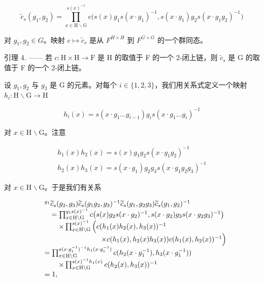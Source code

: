 \[
\widetilde {c} _ {s} (g _ {1}, g _ {2}) = \prod_ {x \in \mathrm{H} \backslash \mathrm{G}} ^ {s (x) ^ {- 1}} c \bigl (s (x) g _ {1} s (x \cdot g _ {1}) ^ {- 1}, s (x \cdot g _ {1}) g _ {2} s (x \cdot g _ {1} g _ {2}) ^ {- 1} \bigr)
\]

对 \(g_{1}, g_{2} \in G\)。映射 \(c \mapsto \widetilde{c}_{s}\) 是从 \(F^{H \times H}\) 到 \(F^{G \times G}\) 的一个群同态。

引理 4. —— 若 \(c: \mathrm{H} \times \mathrm{H} \to \mathrm{F}\) 是 H 的取值于 F 的一个 2-闭上链，则 \(\widetilde{c}_s\) 是 G 的取值于 F 的一个 2-闭上链。

设 \(g_1, g_2\) 与 \(g_3\) 是 G 的元素。对每个 \(i \in \{1, 2, 3\}\)，我们用关系式定义一个映射 \(h_i: \mathrm{H} \backslash \mathrm{G} \to \mathrm{H}\)

\[
h _ {i} (x) = s \left(x \cdot g _ {1} \dots g _ {i - 1}\right) g _ {i} s \left(x \cdot g _ {1} \dots g _ {i}\right) ^ {- 1}
\]

对 \(x\in \mathrm{H}\backslash \mathrm{G}\)。注意

\[
\begin{array}{l} {h _ {1} (x) h _ {2} (x) = s (x) g _ {1} g _ {2} s (x \cdot g _ {1} g _ {2}) ^ {- 1}} \\ {h _ {2} (x) h _ {3} (x) = s (x \cdot g _ {1}) g _ {2} g _ {3} s (x \cdot g _ {1} g _ {2} g _ {3}) ^ {- 1}} \end{array}
\]

对 \(x \in \mathrm{H} \backslash \mathrm{G}\)。于是我们有关系

\[
\begin{array}{r l} & ^ {g _ {1}} \widetilde {c} _ {s} (g _ {2}, g _ {3}) \widetilde {c} _ {s} (g _ {1} g _ {2}, g _ {3}) ^ {- 1} \widetilde {c} _ {s} (g _ {1}, g _ {2} g _ {3}) \widetilde {c} _ {s} (g _ {1}, g _ {2}) ^ {- 1} \\ & \quad = \prod_ {x \in \mathrm{H} \backslash \mathrm{G}} ^ {g _ {1} s (x) ^ {- 1}} c \big (s (x) g _ {2} s (x \cdot g _ {2}) ^ {- 1}, s (x \cdot g _ {2}) g _ {3} s (x \cdot g _ {2} g _ {3}) ^ {- 1} \big) \\ & \qquad \times \prod_ {x \in \mathrm{H} \backslash \mathrm{G}} ^ {s (x) ^ {- 1}} \Big (c (h _ {1} (x) h _ {2} (x), h _ {3} (x)) ^ {- 1} \\ & \qquad \qquad \qquad \qquad \times c (h _ {1} (x), h _ {2} (x) h _ {3} (x))   c (h _ {1} (x), h _ {2} (x)) ^ {- 1} \Big) \\ & = \prod_ {x \in \mathrm{H} \backslash \mathrm{G}} ^ {s (x \cdot g _ {1} ^ {- 1}) ^ {- 1} h _ {1} (x \cdot g _ {1} ^ {- 1})} c (h _ {2} (x \cdot g _ {1} ^ {- 1}), h _ {3} (x \cdot g _ {1} ^ {- 1})) \\ & \qquad \times \prod_ {x \in \mathrm{H} \backslash \mathrm{G}} ^ {s (x) ^ {- 1} h _ {1} (x)} c (h _ {2} (x), h _ {3} (x)) ^ {- 1} \\ & = 1, \end{array}
\]

